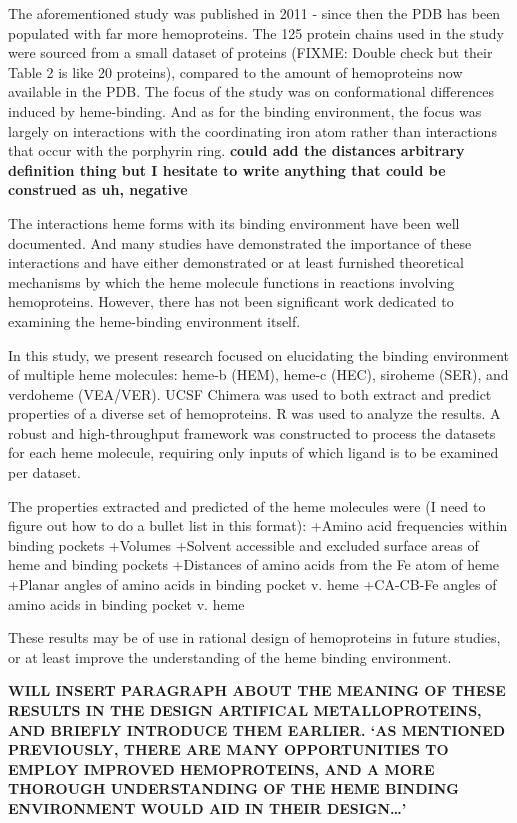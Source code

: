 \documentclass[a4paper, nobind]{templates/ociamthesis}
\begin{document}
The aforementioned study was published in 2011 - since then the PDB has been populated with far more hemoproteins. The 125 protein chains used in the study were sourced from a small dataset of proteins (FIXME: Double check but their Table 2 is like 20 proteins), compared to the amount of hemoproteins now available in the PDB. The focus of the study was on conformational differences induced by heme-binding. And as for the binding environment, the focus was largely on interactions with the coordinating iron atom rather than interactions that occur with the porphyrin ring. \textbf{could add the distances arbitrary definition thing but I hesitate to write anything that could be construed as uh, negative}

The interactions heme forms with its binding environment have been well documented. And many studies have demonstrated the importance of these interactions and have either demonstrated or at least furnished theoretical mechanisms by which the heme molecule functions in reactions involving hemoproteins. However, there has not been significant work dedicated to examining the heme-binding environment itself.

In this study, we present research focused on elucidating the binding environment of multiple heme molecules: heme-b (HEM), heme-c (HEC), siroheme (SER), and verdoheme (VEA/VER). UCSF Chimera was used to both extract and predict properties of a diverse set of hemoproteins. R was used to analyze the results. A robust and high-throughput framework was constructed to process the datasets for each heme molecule, requiring only inputs of which ligand is to be examined per dataset.

The properties extracted and predicted of the heme molecules were (I need to figure out how to do a bullet list in this format):
+Amino acid frequencies within binding pockets
+Volumes
+Solvent accessible and excluded surface areas of heme and binding pockets
+Distances of amino acids from the Fe atom of heme
+Planar angles of amino acids in binding pocket v. heme
+CA-CB-Fe angles of amino acids in binding pocket v. heme

These results may be of use in rational design of hemoproteins in future studies, or at least improve the understanding of the heme binding environment.

\textbf{WILL INSERT PARAGRAPH ABOUT THE MEANING OF THESE RESULTS IN THE DESIGN ARTIFICAL METALLOPROTEINS, AND BRIEFLY INTRODUCE THEM EARLIER. `AS MENTIONED PREVIOUSLY, THERE ARE MANY OPPORTUNITIES TO EMPLOY IMPROVED HEMOPROTEINS, AND A MORE THOROUGH UNDERSTANDING OF THE HEME BINDING ENVIRONMENT WOULD AID IN THEIR DESIGN\ldots{}'}
\end{document}
